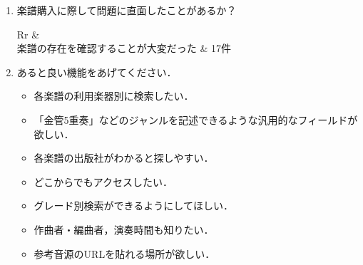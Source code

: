 \begin{oframed}
\begin{enumerate}
        \item 楽譜購入に際して問題に直面したことがあるか？\vspace{.3cm}\\
              \begin{tabularx}{\linewidth}{Rr}
                   &  \\
                  \hline
                  楽譜の存在を確認することが{{大変}}だった              & 17件                                \\
                  \hline
              \end{tabularx}
        \item あると良い機能をあげてください．
              \begin{itemize}
                  \item 各楽譜の利用楽器別に検索したい．
                  \item 「金管5重奏」などのジャンルを記述できるような汎用的なフィールドが欲しい．
                  \item 各楽譜の出版社がわかると探しやすい．
                  \item どこからでもアクセスしたい．
                  \item グレード別検索ができるようにしてほしい．
                  \item 作曲者・編曲者，演奏時間も知りたい．
                  \item 参考音源のURLを貼れる場所が欲しい．
              \end{itemize}
    \end{enumerate}
\end{oframed}